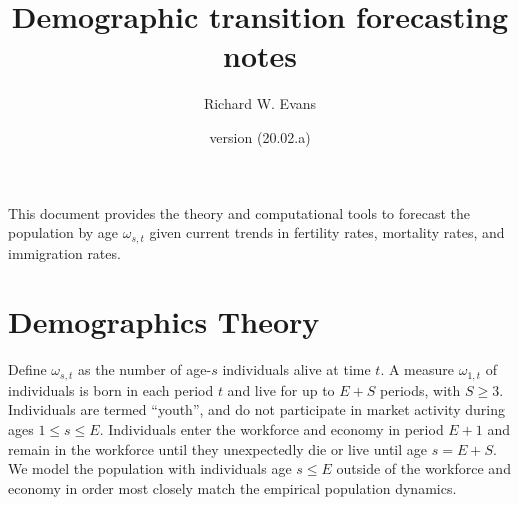 \documentclass[letterpaper,12pt]{article}
\theoremstyle{definition}
\begin{document}
\title{Demographic transition forecasting notes}
\date{version (20.02.a)}
\author{Richard W. Evans}
\maketitle



This document provides the theory and computational tools to forecast the population by age $\omega_{s,t}$ given current trends in fertility rates, mortality rates, and immigration rates.


\section{Demographics Theory}\label{SecTheory}

  Define $\omega_{s,t}$ as the number of age-$s$ individuals alive at time $t$. A measure $\omega_{1,t}$ of individuals is born in each period $t$ and live for up to $E+S$ periods, with $S\geq 3$. Individuals are termed ``youth'', and do not participate in market activity during ages $1\leq s\leq E$. Individuals enter the workforce and economy in period $E+1$ and remain in the workforce until they unexpectedly die or live until age $s=E+S$. We model the population with individuals age $s\leq E$ outside of the workforce and economy in order most closely match the empirical population dynamics.
\end{document}
